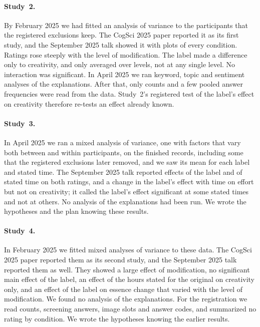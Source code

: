 \paragraph*{Study~2.}
By February 2025 we had fitted an analysis of variance to the \STwoN{} participants that the registered exclusions keep. The CogSci 2025 paper reported it as its first study,\cite{kamper2025originalsin} and the September 2025 talk showed it with plots of every condition. Ratings rose steeply with the level of modification. The label made a difference only to creativity, and only averaged over levels, not at any single level. No interaction was significant. In April 2025 we ran keyword, topic and sentiment analyses of the explanations. After that, only counts and a few pooled answer frequencies were read from the data. Study~2's registered test of the label's effect on creativity therefore re-tests an effect already known.

\paragraph*{Study~3.}
In April 2025 we ran a mixed analysis of variance, one with factors that vary both between and within participants, on the finished records, including some that the registered exclusions later removed, and we saw its mean for each label and stated time. The September 2025 talk reported effects of the label and of stated time on both ratings, and a change in the label's effect with time on effort but not on creativity; it called the label's effect significant at some stated times and not at others. No analysis of the explanations had been run. We wrote the hypotheses and the plan knowing these results.

\paragraph*{Study~4.}
In February 2025 we fitted mixed analyses of variance to these data. The CogSci 2025 paper reported them as its second study, and the September 2025 talk reported them as well. They showed a large effect of modification, no significant main effect of the label, an effect of the hours stated for the original on creativity only, and an effect of the label on essence change that varied with the level of modification. We found no analysis of the explanations. For the registration we read counts, screening answers, image slots and answer codes, and summarized no rating by condition. We wrote the hypotheses knowing the earlier results.

